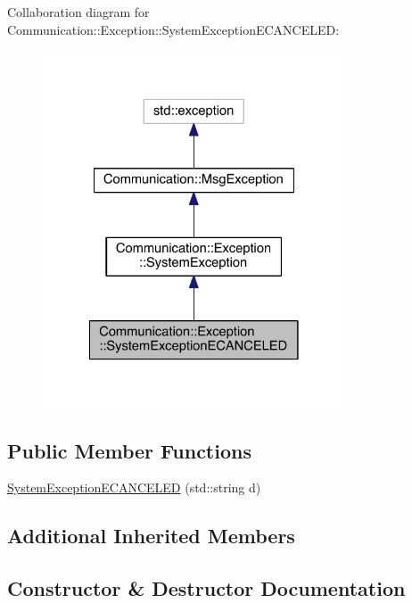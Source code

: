Collaboration diagram for Communication\+:\+:Exception\+:\+:System\+Exception\+E\+C\+A\+N\+C\+E\+L\+E\+D\+:\nopagebreak
\begin{figure}[H]
\begin{center}
\leavevmode
\includegraphics[width=254pt]{class_communication_1_1_exception_1_1_system_exception_e_c_a_n_c_e_l_e_d__coll__graph}
\end{center}
\end{figure}
\subsection*{Public Member Functions}
\begin{DoxyCompactItemize}
\item 
\hyperlink{class_communication_1_1_exception_1_1_system_exception_e_c_a_n_c_e_l_e_d_ab928491b8be10d16aacf31d36a6660d7}{System\+Exception\+E\+C\+A\+N\+C\+E\+L\+E\+D} (std\+::string d)
\end{DoxyCompactItemize}
\subsection*{Additional Inherited Members}


\subsection{Constructor \& Destructor Documentation}
\hypertarget{class_communication_1_1_exception_1_1_system_exception_e_c_a_n_c_e_l_e_d_ab928491b8be10d16aacf31d36a6660d7}{}
